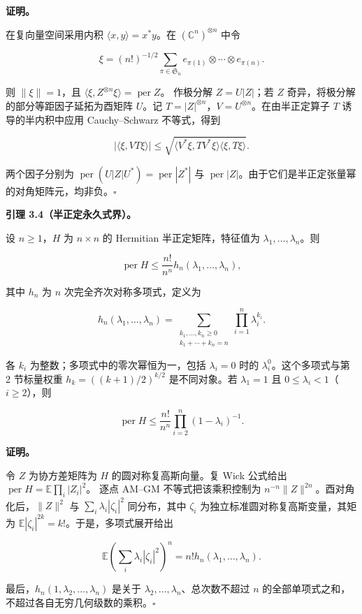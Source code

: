 \documentclass[11pt,a4paper]{article}
\begin{document}
\textbf{证明。}

在复向量空间采用内积 \(\langle x,y\rangle=x^*y\)。在 \((\mathbb C^n)^{\otimes n}\) 中令

\[
\xi=(n!)^{-1/2}
\sum_{\pi\in \mathfrak S_n}
e_{\pi(1)}\otimes\cdots\otimes e_{\pi(n)}.
\]

则 \(\|\xi\|=1\)，且 \(\langle\xi,Z^{\otimes n}\xi\rangle=\operatorname{per}Z\)。 作极分解 \(Z=U|Z|\)；若 \(Z\) 奇异，将极分解的部分等距因子延拓为酉矩阵 \(U\)。记 \(T=|Z|^{\otimes n}\)，\(V=U^{\otimes n}\)。在由半正定算子 \(T\) 诱导的半内积中应用 Cauchy--Schwarz 不等式，得到

\[
|\langle\xi,VT\xi\rangle|
\le\sqrt{\langle V^*\xi,TV^*\xi\rangle
\langle\xi,T\xi\rangle}.
\]

两个因子分别为 \(\operatorname{per}(U|Z|U^*)=\operatorname{per}|Z^*|\) 与 \(\operatorname{per}|Z|\)。由于它们是半正定张量幂的对角矩阵元，均非负。\(\square\)

\textbf{引理 3.4（半正定永久式界）。}

设 \(n\ge1\)，\(H\) 为 \(n\times n\) 的 Hermitian 半正定矩阵，特征值为 \(\lambda_1,\ldots,\lambda_n\)。则

\[
\operatorname{per}H\le\frac{n!}{n^n}h_n(\lambda_1,\ldots,\lambda_n),
\]

其中 \(h_n\) 为 \(n\) 次完全齐次对称多项式，定义为

\[
h_n(\lambda_1,\ldots,\lambda_n)
=\sum_{\substack{k_1,\ldots,k_n\ge0\\k_1+\cdots+k_n=n}}
\prod_{i=1}^n\lambda_i^{k_i}.
\]

各 \(k_i\) 为整数；多项式中的零次幂恒为一，包括 \(\lambda_i=0\) 时的 \(\lambda_i^0\)。这个多项式与第 2 节标量权重 \(h_k=((k+1)/2)^{k/2}\) 是不同对象。若 \(\lambda_1=1\) 且 \(0\le\lambda_i<1\)（\(i\ge2\)），则

\[
\operatorname{per}H\le\frac{n!}{n^n}
\prod_{i=2}^n(1-\lambda_i)^{-1}.
\]

\textbf{证明。}

令 \(Z\) 为协方差矩阵为 \(H\) 的圆对称复高斯向量。复 Wick 公式给出 \(\operatorname{per}H=\mathbb E\prod_i|Z_i|^2\)。 逐点 AM--GM 不等式把该乘积控制为 \(n^{-n}\|Z\|^{2n}\)。酉对角化后，\(\|Z\|^2\) 与 \(\sum_i\lambda_i|\zeta_i|^2\) 同分布，其中 \(\zeta_i\) 为独立标准圆对称复高斯变量，其矩为 \(\mathbb E|\zeta_i|^{2k}=k!\)。于是，多项式展开给出

\[
\mathbb E\left(\sum_i\lambda_i|\zeta_i|^2\right)^n
=n!h_n(\lambda_1,\ldots,\lambda_n).
\]

最后，\(h_n(1,\lambda_2,\ldots,\lambda_n)\) 是关于 \(\lambda_2,\ldots,\lambda_n\)、总次数不超过 \(n\) 的全部单项式之和，不超过各自无穷几何级数的乘积。\(\square\)
\end{document}
